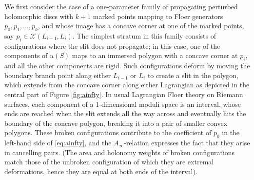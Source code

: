 \documentclass[11pt,leqno]{amsart}
\numberwithin{equation}{section}
\newcommand{\cX}{{\mathcal X}}
\begin{document}
We first consider the case of a one-parameter family of propagating perturbed holomorphic discs with
$k+1$ marked points mapping to Floer generators $p_0,p_1,\dots,p_k$, and whose
image has a concave corner at one of the marked points, say 
$p_i\in \cX(L_{i-1},L_i)$. The simplest stratum in this family consists of
configurations where the slit does not propagate; in this case,
one of the components of $u(S)$ maps to an immersed polygon with 
a concave corner at $p_i$, and all the other components are rigid.
Such configurations deform by moving the boundary branch point along either
$L_{i-1}$ or $L_i$ to create a slit in the polygon, which extends from the concave 
corner along either Lagrangian as depicted in the central part of Figure \ref{fig:ainfty}.
In usual Lagrangian Floer theory on Riemann surfaces, each component of a
1-dimensional moduli space is an interval, whose ends are reached when
the slit extends all the way across and eventually hits the
boundary of the concave polygon, breaking it into a pair of smaller convex polygons.
These broken configurations contribute to the coefficient of $p_0$
in the left-hand side of \eqref{eq:ainfty}, and the $A_\infty$-relation
expresses the fact that they arise in cancelling pairs. (The
area and holonomy weights of broken configurations match those of the
unbroken configuration of which they are extremal deformations, hence they
are equal at both ends of the interval).
\end{document}
